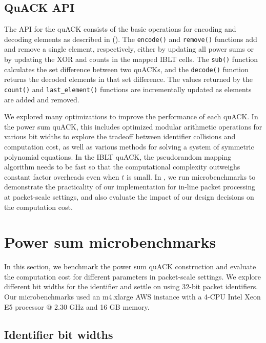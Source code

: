 \subsection{QuACK API}



The API for the quACK consists of the basic operations for encoding and
decoding elements as described in 
(). The
\texttt{encode()} and \texttt{remove()} functions add and remove a single
element, respectively, either by updating all power sums or by updating the XOR
and counts in the mapped IBLT cells. The \texttt{sub()} function calculates the
set difference between two quACKs, and the \texttt{decode()} function returns
the decoded elements in that set difference. The values returned by the
\texttt{count()} and \texttt{last\_element()} functions are incrementally
updated as elements are added and removed.

We explored many optimizations to improve the performance of each quACK.
In the power sum quACK, this includes optimized modular arithmetic operations
for various bit widths to explore the tradeoff between identifier collisions
and computation cost, as well as various methods for solving a system of
symmetric polynomial equations. In the IBLT quACK, the pseudorandom mapping
algorithm needs to be fast so that the computational complexity outweighs
constant factor overheads even when $t$ is small.
In ,
we run microbenchmarks to demonstrate the practicality of our implementation
for in-line packet processing at packet-scale settings, and also evaluate the
impact of our design decisions on the computation cost.

\section{Power sum microbenchmarks}
\label{sec:quack:psum-microbenchmarks}



In this section, we benchmark the power sum quACK construction and evaluate the
computation cost for different parameters in packet-scale settings.
We explore different bit widths for the identifier and settle on
using 32-bit packet identifiers.
Our microbenchmarks used an m4.xlarge AWS instance with a 4-CPU Intel Xeon E5
processor @ 2.30 GHz and 16 GB memory.

\subsection{Identifier bit widths}
\label{sec:quack:psum-microbenchmarks:bit-widths}


